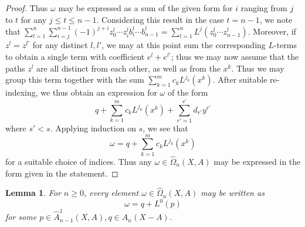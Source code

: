 \documentclass[11pt]{article}
\newtheorem{lemma}[theo]{Lemma}
\theoremstyle{definition}
\numberwithin{equation}{section}
\newcommand{\tOmega}{\widehat{\Omega}}
\newcommand{\tAOne}{\widehat{A}^1}
\begin{document}
\begin{proof}
Thus $\omega$ may be expressed as a sum of the given form for $i$ ranging from $j$ to $t$ for any $j \leq t \leq n-1$. Considering this result in the case $t = n-1$, we note that $\sum_{l=1}^u \sum_{i = j}^{n-1} (-1)^{j+i} z^l_0 \cdots z^l_i b^l_i \cdots b^l_{n-1} = \sum_{l=1}^u L^j(z^l_0 \cdots z^l_{n-1})$. Moreover, if $z^l = z^{l'}$ for any distinct $l, l'$, we may at this point sum the corresponding $L$-terms to obtain a single term with coefficient $e^l + e^{l'}$; thus we may now assume that the paths $z^l$ are all distinct from each other, as well as from the $x^k$. Thus we may group this term together with the sum $\sum_{k = 1}^m c_k L^{j_k}(x^k)$. After suitable re-indexing, we thus obtain an expression for $\omega$ of the form
\[
q + \sum_{k=1}^m c_k L^{j_k}(x^k) + \sum_{r' = 1}^{s'} d_{r'} y^{r'}
\]
where $s' < s$. Applying induction on $s$, we see that
\[
\omega = q + \sum_{k=1}^m c_k L^{j_k}(x^k)
\]
for a suitable choice of indices.
Thus any $\omega \in \tOmega_n(X,A)$ may be expressed in the form given in the statement.
\end{proof}

\begin{lemma}\label{iso-surjective}
For $n \geq 0$, every element $\omega \in \tOmega_n(X,A)$ may be written as
\[
\omega = q + L^0(p)
\]
for some $p \in \tAOne_{n-1}(X,A), q \in A_n(X-A)$.
\end{lemma}
\end{document}
